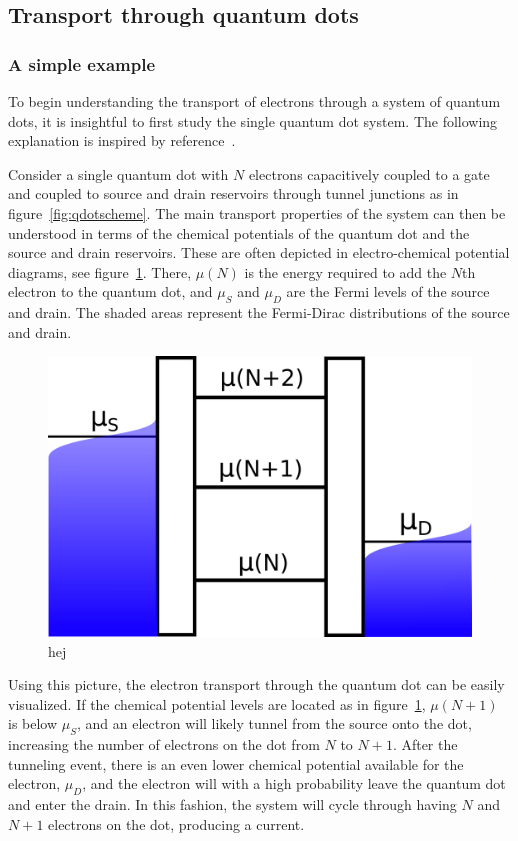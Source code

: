\documentclass[../main.tex]{subfiles}
\begin{document}
\subsection{Transport through quantum dots}
\subsubsection{A simple example}
To begin understanding the transport of electrons through a system of quantum dots, it is insightful to first study the single quantum dot system. The following explanation is inspired by reference~\cite{transport}.

Consider a single quantum dot with $N$ electrons capacitively coupled to a gate and coupled to source and drain reservoirs through tunnel junctions as in figure~\ref{fig:qdotscheme}. The main transport properties of the system can then be understood in terms of the chemical potentials of the quantum dot and the source and drain reservoirs. These are often depicted in electro-chemical potential diagrams, see figure~\ref{fig:ladder}. There, $\mu(N)$ is the energy required to add the $N$th electron to the quantum dot, and $\mu_S$ and $\mu_D$ are the Fermi levels of the source and drain. The shaded areas represent the Fermi-Dirac distributions of the source and drain.
\begin{figure}[H]
    \centering
    \includegraphics[width=0.6\linewidth]{figures/ladder.png}
    \caption{hej}
    \label{fig:ladder}
\end{figure}
Using this picture, the electron transport through the quantum dot can be easily visualized. If the chemical potential levels are located as in figure~\ref{fig:ladder}, $\mu(N + 1)$ is below $\mu_S$, and an electron will likely tunnel from the source onto the dot, increasing the number of electrons on the dot from $N$ to $N+1$. After the tunneling event, there is an even lower chemical potential available for the electron, $\mu_D$, and the electron will with a high probability leave the quantum dot and enter the drain. In this fashion, the system will cycle through having $N$ and $N+1$ electrons on the dot, producing a current.  
\end{document}
